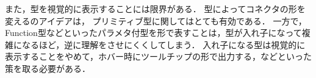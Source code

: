 また，型を視覚的に表示することには限界がある．
型によってコネクタの形を変える\cite{Typed-Blockly}のアイデアは，
プリミティブ型に関してはとても有効である．
一方で，Function型などといったパラメタ付型を形で表すことは，型が入れ子になって複雑になるほど，逆に理解をさせにくくしてしまう．
入れ子になる型は視覚的に表示することをやめて，ホバー時にツールチップの形で出力する，などといった策を取る必要がある．





